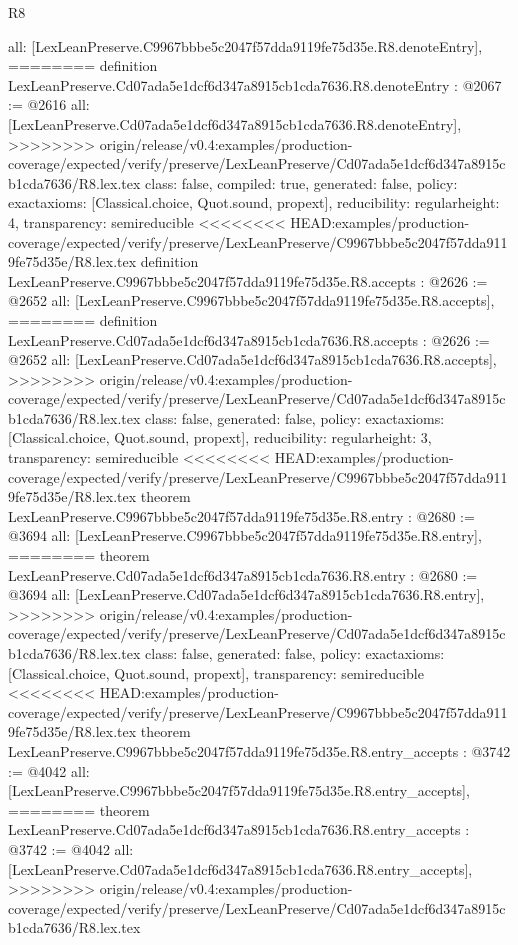 \begin{lexlean}{R8}
\begin{coremodule}
{{{{{{{{{{{{{{{{{{{{{{{{{{{{{{{{{{{{  all: [LexLeanPreserve.C9967bbbe5c2047f57dda9119fe75d35e.R8.denoteEntry],
========
definition LexLeanPreserve.Cd07ada5e1dcf6d347a8915cb1cda7636.R8.denoteEntry : @2067 := @2616 {
  all: [LexLeanPreserve.Cd07ada5e1dcf6d347a8915cb1cda7636.R8.denoteEntry],
>>>>>>>> origin/release/v0.4:examples/production-coverage/expected/verify/preserve/LexLeanPreserve/Cd07ada5e1dcf6d347a8915cb1cda7636/R8.lex.tex
  class: false,
  compiled: true,
  generated: false,
  policy: exact{axioms: [Classical.choice, Quot.sound, propext]},
  reducibility: regular{height: 4},
  transparency: semireducible
}
<<<<<<<< HEAD:examples/production-coverage/expected/verify/preserve/LexLeanPreserve/C9967bbbe5c2047f57dda9119fe75d35e/R8.lex.tex
definition LexLeanPreserve.C9967bbbe5c2047f57dda9119fe75d35e.R8.accepts : @2626 := @2652 {
  all: [LexLeanPreserve.C9967bbbe5c2047f57dda9119fe75d35e.R8.accepts],
========
definition LexLeanPreserve.Cd07ada5e1dcf6d347a8915cb1cda7636.R8.accepts : @2626 := @2652 {
  all: [LexLeanPreserve.Cd07ada5e1dcf6d347a8915cb1cda7636.R8.accepts],
>>>>>>>> origin/release/v0.4:examples/production-coverage/expected/verify/preserve/LexLeanPreserve/Cd07ada5e1dcf6d347a8915cb1cda7636/R8.lex.tex
  class: false,
  generated: false,
  policy: exact{axioms: [Classical.choice, Quot.sound, propext]},
  reducibility: regular{height: 3},
  transparency: semireducible
}
<<<<<<<< HEAD:examples/production-coverage/expected/verify/preserve/LexLeanPreserve/C9967bbbe5c2047f57dda9119fe75d35e/R8.lex.tex
theorem LexLeanPreserve.C9967bbbe5c2047f57dda9119fe75d35e.R8.entry : @2680 := @3694 {
  all: [LexLeanPreserve.C9967bbbe5c2047f57dda9119fe75d35e.R8.entry],
========
theorem LexLeanPreserve.Cd07ada5e1dcf6d347a8915cb1cda7636.R8.entry : @2680 := @3694 {
  all: [LexLeanPreserve.Cd07ada5e1dcf6d347a8915cb1cda7636.R8.entry],
>>>>>>>> origin/release/v0.4:examples/production-coverage/expected/verify/preserve/LexLeanPreserve/Cd07ada5e1dcf6d347a8915cb1cda7636/R8.lex.tex
  class: false,
  generated: false,
  policy: exact{axioms: [Classical.choice, Quot.sound, propext]},
  transparency: semireducible
}
<<<<<<<< HEAD:examples/production-coverage/expected/verify/preserve/LexLeanPreserve/C9967bbbe5c2047f57dda9119fe75d35e/R8.lex.tex
theorem LexLeanPreserve.C9967bbbe5c2047f57dda9119fe75d35e.R8.entry_accepts : @3742 := @4042 {
  all: [LexLeanPreserve.C9967bbbe5c2047f57dda9119fe75d35e.R8.entry_accepts],
========
theorem LexLeanPreserve.Cd07ada5e1dcf6d347a8915cb1cda7636.R8.entry_accepts : @3742 := @4042 {
  all: [LexLeanPreserve.Cd07ada5e1dcf6d347a8915cb1cda7636.R8.entry_accepts],
>>>>>>>> origin/release/v0.4:examples/production-coverage/expected/verify/preserve/LexLeanPreserve/Cd07ada5e1dcf6d347a8915cb1cda7636/R8.lex.tex
}}}}}}}}}}}}}}}}}}}}}}}}}}}}}}}}}}}}}}}}
\end{coremodule}
\end{lexlean}

